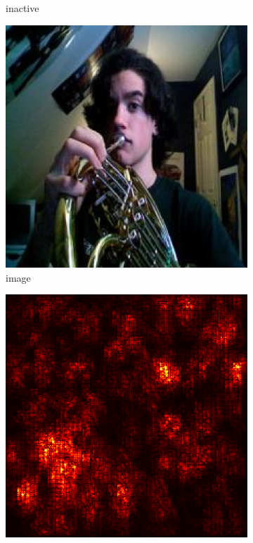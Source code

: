 \documentclass[preprint,12pt]{elsarticle}
\begin{document}
\begin{figure}
\begin{subfigure}{0.14\textwidth}
        \caption{inactive}
    \end{subfigure}
    \hfill
    \begin{subfigure}{0.14\linewidth}
        \centering
        \includegraphics[width=\linewidth]{../visualizations/examples/imagenette/cnn/images/7.png}
        \caption{image}
    \end{subfigure}
    \hfill
    \begin{subfigure}{0.14\linewidth}
        \centering
        \includegraphics[width=\linewidth]{../visualizations/examples/imagenette/cnn/saliency_map/7.png}

\end{subfigure}
\end{figure}
\end{document}
